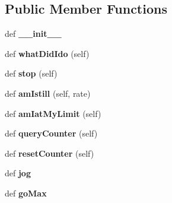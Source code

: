 \subsection*{Public Member Functions}
\begin{DoxyCompactItemize}
\item 
\hypertarget{classpyagilis_1_1channel_1_1_axis_af8ecbb92dc3dcf8dd10dd28bb32c6a70}{}def {\bfseries \+\_\+\+\_\+init\+\_\+\+\_\+}\label{classpyagilis_1_1channel_1_1_axis_af8ecbb92dc3dcf8dd10dd28bb32c6a70}

\item 
\hypertarget{classpyagilis_1_1channel_1_1_axis_ab458b724a8a556c1eda5e59e0a039864}{}def {\bfseries what\+Did\+Ido} (self)\label{classpyagilis_1_1channel_1_1_axis_ab458b724a8a556c1eda5e59e0a039864}

\item 
\hypertarget{classpyagilis_1_1channel_1_1_axis_a0687290da2151921e70a9b888286b1ba}{}def {\bfseries stop} (self)\label{classpyagilis_1_1channel_1_1_axis_a0687290da2151921e70a9b888286b1ba}

\item 
\hypertarget{classpyagilis_1_1channel_1_1_axis_a3db253c98e023dc3aa3dc5e4cb22c019}{}def {\bfseries am\+Istill} (self, rate)\label{classpyagilis_1_1channel_1_1_axis_a3db253c98e023dc3aa3dc5e4cb22c019}

\item 
\hypertarget{classpyagilis_1_1channel_1_1_axis_a9c33e5258d04f1669fb91c726ee1388e}{}def {\bfseries am\+Iat\+My\+Limit} (self)\label{classpyagilis_1_1channel_1_1_axis_a9c33e5258d04f1669fb91c726ee1388e}

\item 
\hypertarget{classpyagilis_1_1channel_1_1_axis_a738f87c70fdea3a66009b44da15ed2a0}{}def {\bfseries query\+Counter} (self)\label{classpyagilis_1_1channel_1_1_axis_a738f87c70fdea3a66009b44da15ed2a0}

\item 
\hypertarget{classpyagilis_1_1channel_1_1_axis_a4303e1496baae0c2689b1d3df23ddbfa}{}def {\bfseries reset\+Counter} (self)\label{classpyagilis_1_1channel_1_1_axis_a4303e1496baae0c2689b1d3df23ddbfa}

\item 
\hypertarget{classpyagilis_1_1channel_1_1_axis_adb3f82948d9d2cabf475a315885742d1}{}def {\bfseries jog}\label{classpyagilis_1_1channel_1_1_axis_adb3f82948d9d2cabf475a315885742d1}

\item 
\hypertarget{classpyagilis_1_1channel_1_1_axis_abe9ced6fe87bb3494369a7f017097442}{}def {\bfseries go\+Max}\label{classpyagilis_1_1channel_1_1_axis_abe9ced6fe87bb3494369a7f017097442}


\end{DoxyCompactItemize}
